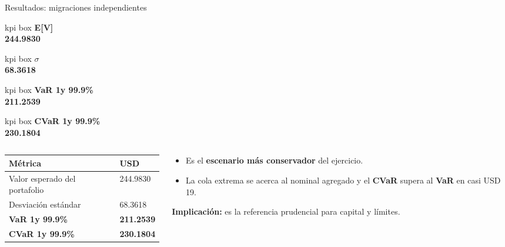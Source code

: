 \documentclass[aspectratio=169,10pt]{beamer}
\newcommand{\smallhead}[1]{\vspace{0.08cm}{\color{udlapblue}\textbf{#1}}\par\vspace{0.03cm}}
\newcommand{\kpi}[2]{%
  \begin{beamercolorbox}[wd=.92\linewidth,sep=0.45ex,rounded=true,center]{kpi box}
    {\scriptsize\textbf{#1}}\\[1pt]
    {\normalsize\textbf{#2}}
  \end{beamercolorbox}
}
\newcommand{\varlabel}[1]{{\color{alertred}\textbf{#1}}}
\newcommand{\cvarlabel}[1]{{\color{udlapblue}\textbf{#1}}}
\begin{document}
\begin{frame}{Resultados: migraciones independientes}
\small
\centering
\begin{minipage}[t]{0.46\linewidth}\centering\kpi{E[V]}{244.9830}\end{minipage}\hfill
\begin{minipage}[t]{0.46\linewidth}\centering\kpi{$\sigma$}{68.3618}\end{minipage}

\vspace{0.14cm}

\begin{minipage}[t]{0.46\linewidth}\centering\kpi{VaR 1y 99.9\%}{211.2539}\end{minipage}\hfill
\begin{minipage}[t]{0.46\linewidth}\centering\kpi{CVaR 1y 99.9\%}{230.1804}\end{minipage}

\vspace{0.22cm}
\begin{columns}[T,onlytextwidth]
  \begin{column}{0.50\textwidth}
    \footnotesize
    \begin{tabular}{L{2.8cm}R{2.1cm}}
      \toprule
      \textbf{M\'etrica} & \textbf{USD} \\
      \midrule
      Valor esperado del portafolio & 244.9830 \\
      Desviaci\'on est\'andar & 68.3618 \\
      \varlabel{VaR 1y 99.9\%} & \varlabel{211.2539} \\
      \cvarlabel{CVaR 1y 99.9\%} & \cvarlabel{230.1804} \\
      \bottomrule
    \end{tabular}
  \end{column}
    \begin{column}{0.43\textwidth}
      \smallhead{Lectura}
      \begin{itemize}
        \item Es el \textbf{escenario m\'as conservador} del ejercicio.
        \item La cola extrema se acerca al nominal agregado y el \cvarlabel{CVaR}
        supera al \varlabel{VaR} en casi USD 19.
      \end{itemize}

      \textbf{Implicaci\'on:} es la referencia prudencial para capital y l\'imites.
    \end{column}
  \end{columns}
  \end{frame}
\end{document}
